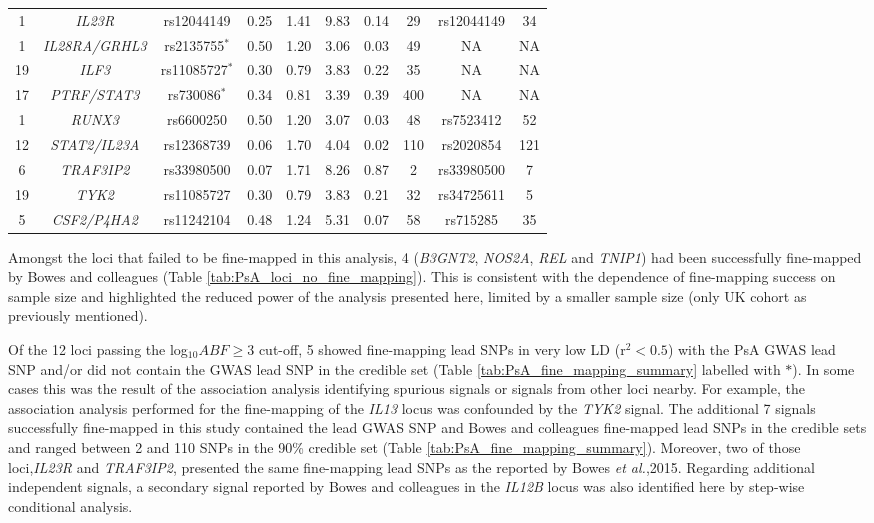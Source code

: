 \begin{landscape}
\begin{center}
\begin{longtable}[ht]{c c c c c c c c c c}
1	 &\textit{IL23R}	       &rs12044149	&0.25	&1.41	&9.83	&0.14	&29	&rs12044149	&34 \\
1	 &\textit{IL28RA/GRHL3}  &rs2135755$^{\ast}$	&0.50	&1.20	&3.06	&0.03	&49	&NA	&NA \\
19 &\textit{ILF3}	         &rs11085727$^{\ast}$	&0.30	&0.79	&3.83	&0.22	&35	&NA	&NA \\
17 &\textit{PTRF/STAT3}    &rs730086$^{\ast}$ &0.34 &0.81 &3.39 &0.39 &400	&NA	&NA \\
1	 & \textit{RUNX3}	       & rs6600250	&0.50	&1.20	&3.07	&0.03	&48	&rs7523412	&52 \\
12 &\textit{STAT2/IL23A}	 &rs12368739	&0.06	&1.70	&4.04	&0.02	&110 &	rs2020854	&121 \\
6	 & \textit{TRAF3IP2}	   &rs33980500	&0.07	&1.71	&8.26	&0.87	&2	&rs33980500	&7 \\
19 &	\textit{TYK2}	       &rs11085727	&0.30	&0.79	&3.83	&0.21	&32	&rs34725611	&5 \\
5	 & \textit{CSF2/P4HA2}	 &rs11242104  &0.48 &1.24 &5.31 &0.07 &58	&rs715285 &35 \\
\bottomrule
\end{longtable}
\end{center}
\end{landscape}


Amongst the loci that failed to be fine-mapped in this analysis, 4 (\textit{B3GNT2}, \textit{NOS2A}, \textit{REL} and \textit{TNIP1}) had been successfully fine-mapped by Bowes and colleagues (Table \ref{tab:PsA_loci_no_fine_mapping}). This is consistent with the dependence of fine-mapping success on sample size \parencite{Bunt2015} and highlighted the reduced power of the analysis presented here, limited by a smaller sample size (only UK cohort as previously mentioned).


Of the 12 loci passing the log${_10}ABF\geq3$ cut-off, 5 showed fine-mapping lead SNPs in very low LD (r${^2}<0.5$) with the PsA GWAS lead SNP and/or did not contain the GWAS lead SNP in the credible set (Table \ref{tab:PsA_fine_mapping_summary} labelled with $\ast$). In some cases this was the result of the association analysis identifying spurious signals or signals from other loci nearby. For example, the association analysis performed for the fine-mapping of the \textit{IL13} locus was confounded by the \textit{TYK2} signal. The additional 7 signals successfully fine-mapped in this study contained the lead GWAS SNP and Bowes and colleagues fine-mapped lead SNPs in the credible sets and ranged between 2 and 110 SNPs in the 90\% credible set (Table \ref{tab:PsA_fine_mapping_summary}). Moreover, two of those loci,\textit{IL23R} and \textit{TRAF3IP2}, presented the same fine-mapping lead SNPs as the reported by Bowes \textit{et al.},2015. Regarding additional independent signals, a secondary signal reported by Bowes and colleagues in the \textit{IL12B} locus was also identified here by step-wise conditional analysis. 


